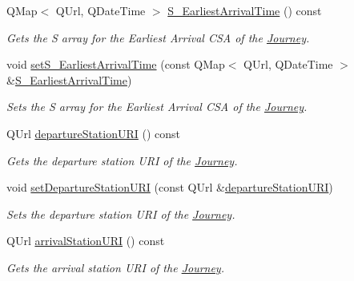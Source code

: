 \begin{DoxyCompactItemize}
Q\+Map$<$ Q\+Url, Q\+Date\+Time $>$ \mbox{\hyperlink{classQRail_1_1RouterEngine_1_1Journey_a7fe25d3e03ff906868d6892b80008041}{S\+\_\+\+Earliest\+Arrival\+Time}} () const
\begin{DoxyCompactList}\small\item\em Gets the S array for the Earliest Arrival C\+SA of the \mbox{\hyperlink{classQRail_1_1RouterEngine_1_1Journey}{Journey}}. \end{DoxyCompactList}\item 
void \mbox{\hyperlink{classQRail_1_1RouterEngine_1_1Journey_acff9510bc00a4f052c28ee6151518d4d}{set\+S\+\_\+\+Earliest\+Arrival\+Time}} (const Q\+Map$<$ Q\+Url, Q\+Date\+Time $>$ \&\mbox{\hyperlink{classQRail_1_1RouterEngine_1_1Journey_a7fe25d3e03ff906868d6892b80008041}{S\+\_\+\+Earliest\+Arrival\+Time}})
\begin{DoxyCompactList}\small\item\em Sets the S array for the Earliest Arrival C\+SA of the \mbox{\hyperlink{classQRail_1_1RouterEngine_1_1Journey}{Journey}}. \end{DoxyCompactList}\item 
Q\+Url \mbox{\hyperlink{classQRail_1_1RouterEngine_1_1Journey_ad541f71d07fc32b762463cf4241d03db}{departure\+Station\+U\+RI}} () const
\begin{DoxyCompactList}\small\item\em Gets the departure station U\+RI of the \mbox{\hyperlink{classQRail_1_1RouterEngine_1_1Journey}{Journey}}. \end{DoxyCompactList}\item 
void \mbox{\hyperlink{classQRail_1_1RouterEngine_1_1Journey_a6001845dd7a206a719712a28a1c0a097}{set\+Departure\+Station\+U\+RI}} (const Q\+Url \&\mbox{\hyperlink{classQRail_1_1RouterEngine_1_1Journey_ad541f71d07fc32b762463cf4241d03db}{departure\+Station\+U\+RI}})
\begin{DoxyCompactList}\small\item\em Sets the departure station U\+RI of the \mbox{\hyperlink{classQRail_1_1RouterEngine_1_1Journey}{Journey}}. \end{DoxyCompactList}\item 
Q\+Url \mbox{\hyperlink{classQRail_1_1RouterEngine_1_1Journey_a94616e16630e6047dd4770e723ec4bfa}{arrival\+Station\+U\+RI}} () const
\begin{DoxyCompactList}\small\item\em Gets the arrival station U\+RI of the \mbox{\hyperlink{classQRail_1_1RouterEngine_1_1Journey}{Journey}}. \end{DoxyCompactList}\item 

\end{DoxyCompactItemize}
